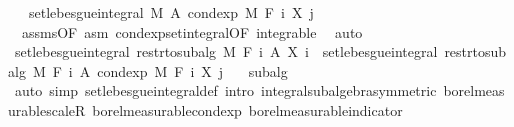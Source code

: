 \begin{isabellebody}
\ {\isachardoublequoteopen}{\isachardot}{\kern0pt}{\isachardot}{\kern0pt}{\isachardot}{\kern0pt}\ {\isacharequal}{\kern0pt}\ set{\isacharunderscore}{\kern0pt}lebesgue{\isacharunderscore}{\kern0pt}integral\ M\ A\ {\isacharparenleft}{\kern0pt}cond{\isacharunderscore}{\kern0pt}exp\ M\ {\isacharparenleft}{\kern0pt}F\ i{\isacharparenright}{\kern0pt}\ {\isacharparenleft}{\kern0pt}X\ j{\isacharparenright}{\kern0pt}{\isacharparenright}{\kern0pt}{\isachardoublequoteclose}\ \isamarkupfalse%
\ {\isacharasterisk}{\kern0pt}\ assms{\isacharparenleft}{\kern0pt}{}{\isacharparenright}{\kern0pt}{\isacharbrackleft}{\kern0pt}OF\ asm{\isacharbrackright}{\kern0pt}\ cond{\isacharunderscore}{\kern0pt}exp{\isacharunderscore}{\kern0pt}set{\isacharunderscore}{\kern0pt}integral{\isacharbrackleft}{\kern0pt}OF\ integrable{\isacharbrackright}{\kern0pt}\ \isamarkupfalse%
\ auto\isanewline
\ \ \ \ \isamarkupfalse%
\ \isamarkupfalse%
\ {\isachardoublequoteopen}set{\isacharunderscore}{\kern0pt}lebesgue{\isacharunderscore}{\kern0pt}integral\ {\isacharparenleft}{\kern0pt}restr{\isacharunderscore}{\kern0pt}to{\isacharunderscore}{\kern0pt}subalg\ M\ {\isacharparenleft}{\kern0pt}F\ i{\isacharparenright}{\kern0pt}{\isacharparenright}{\kern0pt}\ A\ {\isacharparenleft}{\kern0pt}X\ i{\isacharparenright}{\kern0pt}\ {\isacharequal}{\kern0pt}\ set{\isacharunderscore}{\kern0pt}lebesgue{\isacharunderscore}{\kern0pt}integral\ {\isacharparenleft}{\kern0pt}restr{\isacharunderscore}{\kern0pt}to{\isacharunderscore}{\kern0pt}subalg\ M\ {\isacharparenleft}{\kern0pt}F\ i{\isacharparenright}{\kern0pt}{\isacharparenright}{\kern0pt}\ A\ {\isacharparenleft}{\kern0pt}cond{\isacharunderscore}{\kern0pt}exp\ M\ {\isacharparenleft}{\kern0pt}F\ i{\isacharparenright}{\kern0pt}\ {\isacharparenleft}{\kern0pt}X\ j{\isacharparenright}{\kern0pt}{\isacharparenright}{\kern0pt}{\isachardoublequoteclose}\ \isamarkupfalse%
\ {\isacharasterisk}{\kern0pt}\ subalg\ \isamarkupfalse%
\ {\isacharparenleft}{\kern0pt}auto\ simp{\isacharcolon}{\kern0pt}\ set{\isacharunderscore}{\kern0pt}lebesgue{\isacharunderscore}{\kern0pt}integral{\isacharunderscore}{\kern0pt}def\ intro{\isacharbang}{\kern0pt}{\isacharcolon}{\kern0pt}\ integral{\isacharunderscore}{\kern0pt}subalgebra{}{\isacharbrackleft}{\kern0pt}symmetric{\isacharbrackright}{\kern0pt}\ borel{\isacharunderscore}{\kern0pt}measurable{\isacharunderscore}{\kern0pt}scaleR\ borel{\isacharunderscore}{\kern0pt}measurable{\isacharunderscore}{\kern0pt}cond{\isacharunderscore}{\kern0pt}exp\ borel{\isacharunderscore}{\kern0pt}measurable{\isacharunderscore}{\kern0pt}indicator{\isacharparenright}{\kern0pt}\isanewline

\end{isabellebody}
